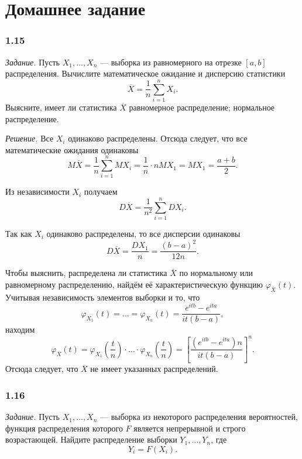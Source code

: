 \section*{Домашнее задание}

\subsubsection*{1.15}

\textit{Задание.}
Пусть $X_1, \dotsc, X_n$ ---
выборка из равномерного на отрезке $ \left[ a, b \right] $ распределения.
Вычислите математическое ожидание и дисперсию статистики
$$ \overline{X} =
  \frac{1}{n} \sum \limits_{i = 1}^n X_i.$$
Выясните, имеет ли статистика $ \overline{X}$ равномерное распределение; нормальное распределение.

\textit{Решение.} Все $X_i$ одинаково распределены.
Отсюда следует, что все математические ожидания одинаковы
$$M \overline{X} =
  \frac{1}{n} \sum \limits_{i = 1}^n MX_i =
  \frac{1}{n} \cdot nMX_1 =
  MX_1 =
  \frac{a+b}{2}.$$

Из независимости $X_i$ получаем
$$D \overline{X} =
  \frac{1}{n^2} \sum \limits_{i = 1}^n DX_i.$$

Так как $X_i$ одинаково распределены, то все дисперсии одинаковы
$$D \overline{X} =
  \frac{DX_1}{n} =
  \frac{ \left( b - a \right)^2}{12n}.$$

Чтобы выяснить,
распределена ли статистика $ \overline{X}$ по нормальному или равномерному распределению,
найдём её характеристическую функцию $ \varphi_{ \overline{X}} \left( t \right) $.
Учитывая независимость элементов выборки и то, что
$$ \varphi_{X_1} \left( t \right) =
  \dotsc =
  \varphi_{X_n} \left( t \right) =
  \frac{e^{itb} - e^{ita}}{it \left( b - a \right) },$$
находим
$$ \varphi_{ \overline{X}} \left( t \right) =
  \varphi_{X_1} \left( \frac{t}{n} \right) \cdot
  \dotsc \cdot
  \varphi_{X_n} \left( \frac{t}{n} \right) =
  \left[ \frac{\left( e^{itb} - e^{ita} \right) n}{it \left( b - a \right)} \right]^n.$$
Отсюда следует, что $ \overline{X}$ не имеет указанных распределений.

\subsubsection*{1.16}

\textit{Задание.}
Пусть $X_1, \dotsc, X_n$ --- выборка из некоторого распределения вероятностей,
функция распределения которого $F$ является непрерывной и строго возрастающей.
Найдите распределение выборки $Y_1, \dotsc, Y_n$, где
$$Y_i =
  F \left( X_i \right).$$

